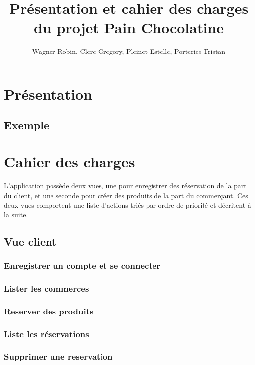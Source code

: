 \documentclass[a4paper,11pt]{article}
\title{Présentation et cahier des charges du projet Pain Chocolatine}
\author{Wagner Robin, Clerc Gregory, Pleinet Estelle, Porteries Tristan}
\begin{document}
\maketitle

\tableofcontents

\section{Présentation}

\subsection{Exemple}

\section{Cahier des charges}

L'application possède deux vues, une pour enregistrer des réservation de la part du client, et une seconde pour créer des produits de la part du commerçant. Ces deux vues comportent une liste d'actions triés par ordre de priorité et décritent à la suite.

\subsection{Vue client}

\subsubsection{Enregistrer un compte et se connecter}

\subsubsection{Lister les commerces}

\subsubsection{Reserver des produits}

\subsubsection{Liste les réservations}

\subsubsection{Supprimer une reservation}
\end{document}
